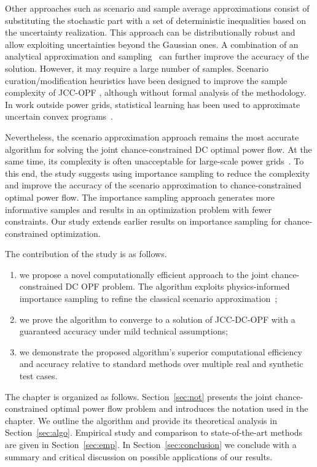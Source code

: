 Other approaches such as scenario and sample average approximations \cite{calafiore2006scenario,garatti2019risk, vrakopoulou2013probabilistic,nemirovski2006scenario} consist of substituting the stochastic part with a set of deterministic inequalities based on the uncertainty realization. This approach can be distributionally robust and allow exploiting uncertainties beyond the Gaussian ones. A combination of an analytical approximation and sampling~\cite{hou2020chance} can further improve the accuracy of the solution. However, it may require a large number of samples. Scenario curation/modification heuristics have been designed to improve the sample complexity of JCC-OPF \cite{mezghani2020stochastic}, although without formal analysis of the methodology. In work outside power grids, statistical learning has been used to approximate uncertain convex programs~\cite{vapnik1999overview,maximov2016tight,campi2020scenario}.

Nevertheless, the scenario approximation approach remains the most accurate algorithm for solving the joint chance-constrained DC optimal power flow. At the same time, its complexity is often unacceptable for large-scale power grids~\cite{sakhavand2020new}. To this end, the study suggests using importance sampling to reduce the complexity and improve the accuracy of the scenario approximation to chance-constrained optimal power flow. The importance sampling approach generates more informative samples and results in an optimization problem with fewer constraints. Our study extends earlier results \cite{barrera2016chance,tong2022optimization} on importance sampling for chance-constrained optimization. 

The contribution of the study is as follows. 
\begin{enumerate}
  \item we propose a novel computationally efficient 
  approach to the joint chance-constrained DC OPF problem. The algorithm exploits physics-informed importance sampling to refine the classical scenario approximation~\cite{calafiore2006scenario};
  \item we prove the algorithm to converge to a solution of JCC-DC-OPF with a guaranteed accuracy under mild technical assumptions; 
  \item we demonstrate the proposed algorithm's superior computational efficiency and accuracy relative to standard methods over multiple real and synthetic test cases.
\end{enumerate}

The chapter is organized as follows.
Section~\ref{sec:not} presents the joint chance-constrained optimal power flow problem and introduces the notation used in the chapter. We outline the algorithm and provide its theoretical analysis in Section~\ref{sec:algo}. Empirical study and comparison to state-of-the-art methods are given in Section~\ref{sec:emp}. In Section~\ref{sec:conclusion} we conclude with a summary and critical discussion on possible applications of our results.



